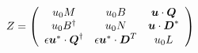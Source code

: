 \begin{equation}
Z= \left(
\begin{array}{ccc}
u_0 M & u_0 B & \mbox{\boldmath$u$} \cdot \mbox{\boldmath$Q$}  \\
u_0 B^\dag & u_0 N & \mbox{\boldmath$u$} \cdot \mbox{\boldmath$D$}^{*}   \\
\epsilon \mbox{\boldmath$u$}^{*} \cdot \mbox{\boldmath$Q$}^\dag   & \epsilon \mbox{\boldmath$u$}^{*} \cdot 
\mbox{\boldmath$D$}^T   & u_0 L 
\end{array} \right)
\end{equation} 
